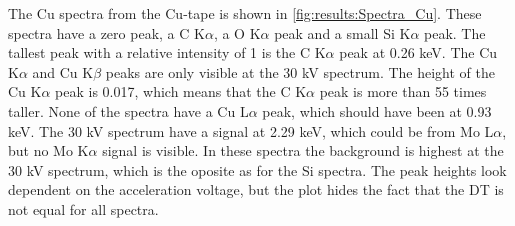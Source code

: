 The Cu spectra from the Cu-tape is shown in \cref{fig:results:Spectra_Cu}.
These spectra have a zero peak, a C K$\alpha$, a O K$\alpha$ peak and a small Si K$\alpha$ peak.
The tallest peak with a relative intensity of 1 is the C K$\alpha$ peak at 0.26 keV.
The Cu K$\alpha$ and Cu K$\beta$ peaks are only visible at the 30 kV spectrum.
The height of the Cu K$\alpha$ peak is 0.017, which means that the C K$\alpha$ peak is more than 55 times taller.
None of the spectra have a Cu L$\alpha$ peak, which should have been at 0.93 keV.
The 30 kV spectrum have a signal at 2.29 keV, which could be from Mo L$\alpha$, but no Mo K$\alpha$ signal is visible.
In these spectra the background is highest at the 30 kV spectrum, which is the oposite as for the Si spectra.
The peak heights look dependent on the acceleration voltage, but the plot hides the fact that the DT is not equal for all spectra.




